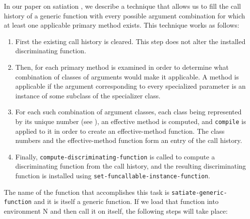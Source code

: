 In our paper on satiation \cite{Strandh:2014:RMI:2635648.2635656}, we
describe a technique that allows us to fill the call history of a
generic function with every possible argument combination for which at
least one applicable primary method exists.  This technique works as
follows:

\begin{enumerate}
\item First the existing call history is cleared.  This step does not
  alter the installed discriminating function.
\item Then, for each primary method is examined in order to determine
  what combination of classes of arguments would make it applicable.
  A method is applicable if the argument corresponding to every
  specialized parameter is an instance of some subclass of the
  specializer class.
\item For each such combination of argument classes, each class being
  represented by its unique number (see
  \cite{Durand-Strandh:2019:ELS:Bootstrapping}), an effective method
  is computed, and \texttt{compile} is applied to it in order to
  create an effective-method function.  The class numbers and the
  effective-method function form an entry of the call history.
\item Finally, \texttt{compute-discriminating-function} is called to
  compute a discriminating function from the call history, and the
  resulting discriminating function is installed using
  \texttt{set-funcallable-instance-function}.
\end{enumerate}

The name of the function that accomplishes this task is
\texttt{satiate-generic-function} and it is itself a generic
function.  If we load that function into environment N and then call
it on itself, the following steps will take place:

